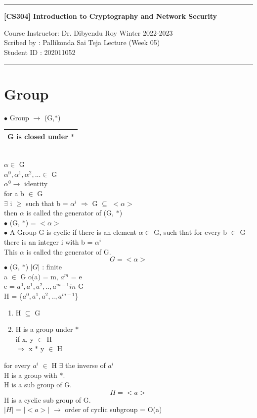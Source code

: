 \documentclass[11pt]{article}
\begin{document}
	\noindent
	\rule{\textwidth}{1pt}
	\begin{center}
		{\bf [CS304] Introduction to Cryptography and Network Security}
	\end{center}
	Course Instructor: Dr. Dibyendu Roy \hfill Winter 2022-2023\\
	Scribed by : Pallikonda Sai Teja  \hfill Lecture (Week 05)\\
	Student ID : 202011052\\
	\rule{\textwidth}{1pt}
	\section{Group}
	$\bullet$ Group $\rightarrow$ (G,$\ast$) \hfill 
	\begin{tabular}{| c |}
		\hline
		G is closed under $\ast$\\
		\hline
	\end{tabular}\\
	$\alpha \in$ G\\
	$\alpha^0, \alpha^1, \alpha^2,... \in$ G\\
	$\alpha^0 \rightarrow$ identity\\
	for a b $\in$ G\\
	$\exists$ i $\geq$ such that b = $\alpha^i$ $\Rightarrow$ G $\subseteq$ $<\alpha>$\\
	then $\alpha$ is called the generator of (G, $\ast$)\\
	$\bullet$ (G, $\ast$) = $<\alpha>$\\
	$\bullet$ A Group G is cyclic if there is an element $\alpha \in$ G, such that for every b $\in$ G there is an integer i with b = $\alpha^i$\\
	This $\alpha$ is called the generator of G. $$G = <\alpha>$$
	$\bullet$ (G, $\ast$) \hfill $|G|$ : finite\\
	a $\in$ G o(a) = m, $a^m$ = e\\
	e = $a^0, a^1, a^2,..,a^{m-1} in$ G\\
	H = \{$a^0, a^1, a^2,..,a^{m-1}$\}
	\begin{enumerate}
		\item H  $\subseteq$ G
		\item H is a group under $\ast$\\if x, y $\in$ H\\$\Rightarrow$ x $\ast$ y $\in$ H
	\end{enumerate}
	for every $a^i$ $\in$ H $\exists$ the inverse of $a^i$\\
	H is a group with $\ast$.\\
	H is a sub group of G.$$H = <a>$$
	H is a cyclic sub group of G.\\
	$|H|$ = $|<a>|$ $\rightarrow$ order of cyclic subgroup = O(a)
	
\end{document}
